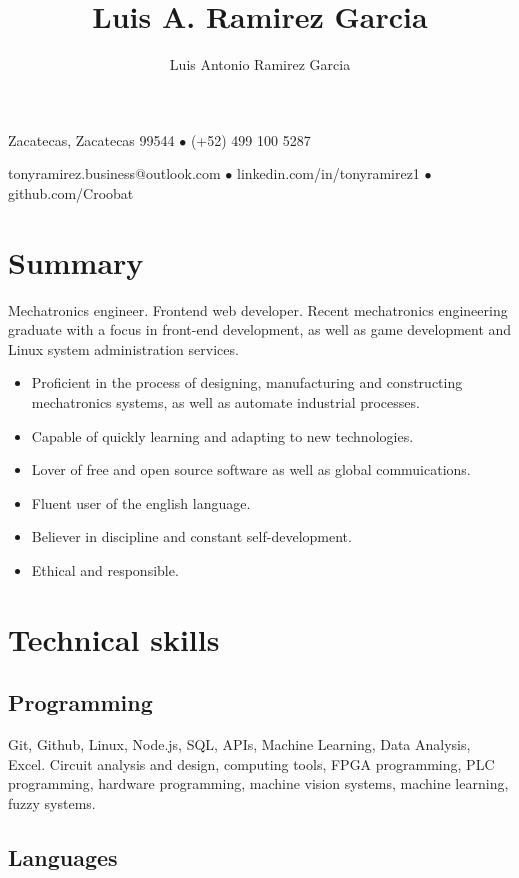 \documentclass{article}
\author{Luis Antonio Ramirez Garcia}
\title{Luis A. Ramirez Garcia}
\makeatletter
\renewcommand{\maketitle}{
  \begin{center}
    {
      \huge\bfseries
      \theauthor
    }

    \vspace{1em}

    Zacatecas, Zacatecas 99544 $\bullet$ (+52) 499 100 5287

    \vspace{0.5em}

    tonyramirez.business@outlook.com $\bullet$ linkedin.com/in/tonyramirez1 $\bullet$ github.com/Croobat

    \vspace{-0.5em}

  \end{center}
}
\makeatother
\begin{document}
  \maketitle

  \section{Summary}%

  Mechatronics engineer. Frontend web developer. Recent mechatronics engineering graduate with a focus in front-end development, as well as game development and Linux system administration services.

  \begin{itemize}
    \item Proficient in the process of designing, manufacturing and constructing mechatronics systems, as well as automate industrial processes.

    \item Capable of quickly learning and adapting to new technologies.

    \item Lover of free and open source software as well as global commuications.

    \item Fluent user of the english language.

    \item Believer in discipline and constant self-development.

    \item Ethical and responsible.
  \end{itemize}%


  \section{Technical skills}%

  \subsection{Programming}

  Git, Github, Linux, Node.js, SQL, APIs, Machine Learning, Data Analysis, Excel. Circuit analysis and design, computing tools, FPGA programming, PLC programming,  hardware programming, machine vision systems, machine learning, fuzzy systems.

    \subsection{Languages}
\end{document}
